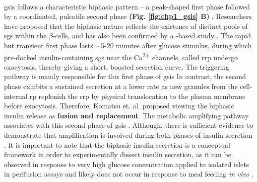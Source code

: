 \\


\par \gls{gsis} follows a characteristic biphasic pattern – a peak-shaped first phase followed by a coordinated, pulsatile second phase \textbf{(Fig. \ref{fig:chp1_gsis} B)} \textbf{\cite{ashcroft_diabetes_2012,grodsky_threshold_1972,komatsu_glucosestimulated_2013}}. Researchers have proposed that the biphasic nature reflects the existence of distinct pools of \glspl{sg} within the $\beta$-cells, and has also been confirmed by a -based study \textbf{\cite{ashcroft_diabetes_2012,takahashi_snare_2010}}. The rapid but transient first phase lasts $\sim$5-20 minutes after glucose stimulus, during which pre-docked insulin-containing \glspl{sg} near the Ca\textsuperscript{2+} channels, called \gls{rrp} undergo exocytosis, thereby giving a short, boosted secretion curve. The triggering pathway is mainly responsible for this first phase of \gls{gsis} \textbf{\cite{kalwat_mechanisms_2017,campbell_mechanisms_2021}} %
In contrast, the second phase exhibits a sustained secretion at a lower rate as new granules from the cell-internal \gls{rp} replenish the \gls{rrp} by physical translocation to the plasma membrane before exocytosis. Therefore, Komatsu et. al. \textbf{\cite{komatsu_glucosestimulated_2013}} proposed viewing the biphasic insulin release as \textbf{fusion and replacement}. The metabolic amplifying pathway associates with this second phase of \gls{gsis} \textbf{\cite{kalwat_mechanisms_2017,campbell_mechanisms_2021}}. Although, there is sufficient evidence to demonstrate that amplification is involved during both phases of insulin secretion \textbf{\cite{mourad_metabolic_2010,mourad_metabolic_2011}}. It is important to note that the biphasic insulin secretion is a conceptual framework in order to experimentally dissect insulin secretion, as it can be observed in response to very high glucose concentration applied to isolated islets in perifusion assays and likely does not occur in response to meal feeding \textit{in vivo} \textbf{\cite{aizawa_rab27a_2005}}.\\

